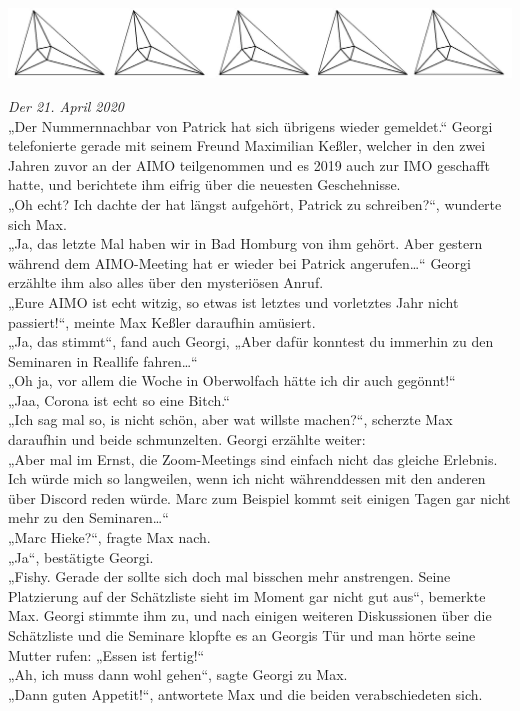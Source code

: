 \documentclass[oneside]{memoir}
\newcommand{\parasep}{
\bigskip
\bigskip
\begin{center} 
   \includegraphics[scale=.08]{parasep5.jpg} 
\end{center}
\bigskip
\bigskip
}
\begin{document}
\parasep

\textit{Der 21. April 2020} \\ 
„Der Nummernnachbar von Patrick hat sich übrigens wieder gemeldet.“ Georgi telefonierte gerade mit seinem Freund Maximilian Keßler, welcher in den zwei Jahren zuvor an der AIMO teilgenommen und es 2019 auch zur IMO geschafft hatte, und berichtete ihm eifrig über die neuesten Geschehnisse. \\
 „Oh echt? Ich dachte der hat längst aufgehört, Patrick zu schreiben?“, wunderte sich Max. \\
 „Ja, das letzte Mal haben wir in Bad Homburg von ihm gehört. Aber gestern während dem AIMO-Meeting hat er wieder bei Patrick angerufen\ldots“ Georgi erzählte ihm also alles über den mysteriösen Anruf. \\
 „Eure AIMO ist echt witzig, so etwas ist letztes und vorletztes Jahr nicht passiert!“, meinte Max Keßler daraufhin amüsiert. \\
 „Ja, das stimmt“, fand auch Georgi, „Aber dafür konntest du immerhin zu den Seminaren in Reallife fahren\ldots“ \\
  „Oh ja, vor allem die Woche in Oberwolfach hätte ich dir auch gegönnt!“ \\
   „Jaa, Corona ist echt so eine Bitch.“ \\
    „Ich sag mal so, is nicht schön, aber wat willste machen?“, scherzte Max daraufhin und beide schmunzelten. Georgi erzählte weiter: \\
    „Aber mal im Ernst, die Zoom-Meetings sind einfach nicht das gleiche Erlebnis. Ich würde mich so langweilen, wenn ich nicht währenddessen mit den anderen über Discord reden würde. Marc zum Beispiel kommt seit einigen Tagen gar nicht mehr zu den Seminaren\ldots“ \\
    „Marc Hieke?“, fragte Max nach. \\
     „Ja“, bestätigte Georgi. \\
     „Fishy. Gerade der sollte sich doch mal bisschen mehr anstrengen. Seine Platzierung auf der Schätzliste sieht im Moment gar nicht gut aus“, bemerkte Max. Georgi stimmte ihm zu, und nach einigen weiteren Diskussionen über die Schätzliste und die Seminare klopfte es an Georgis Tür und man hörte seine Mutter rufen: „Essen ist fertig!“ \\
     „Ah, ich muss dann wohl gehen“, sagte Georgi zu Max. \\
     „Dann guten Appetit!“, antwortete Max und die beiden verabschiedeten sich.
     
\end{document}
